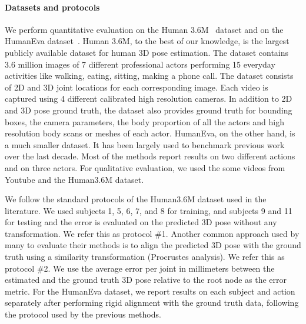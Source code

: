 \documentclass[runningheads]{llncs}
\begin{document}
\paragraph{Datasets and protocols} 

We perform quantitative evaluation on the Human 3.6M~\cite{h36m_pami} dataset and on the HumanEva dataset~\cite{heva}. Human 3.6M, to the best of our knowledge, is the largest publicly available dataset for human 3D pose estimation. The dataset contains 3.6 million images of 7 different professional actors performing 15 everyday activities like walking, eating, sitting, making a phone call. The dataset consists of 2D and 3D joint locations for each corresponding image. Each video is captured using 4 different calibrated high resolution cameras. In addition to 2D and 3D pose ground truth, the dataset also provides ground truth for bounding boxes, the camera parameters, the body proportion of all the actors and high resolution body scans or meshes of each actor. HumanEva, on the other hand, is a much smaller dataset. It has been largely used to benchmark previous work over the last decade. Most of the methods report results on two different actions and on three actors. For qualitative evaluation, we used the some videos from Youtube and the Human3.6M dataset.

We follow the standard protocols of the Human3.6M dataset used in the literature. We used subjects 1, 5, 6, 7, and 8 for training, and subjects 9 and 11 for testing and the error is evaluated on the predicted 3D pose without any transformation. We refer this as protocol \#1. Another common approach used by many to evaluate their methods is to align the predicted 3D pose with the ground truth using a similarity transformation (Procrustes analysis). We refer this as protocol \#2. We use the average error per joint in millimeters between the estimated and the ground truth 3D pose relative to the root node as the error metric. For the HumanEva dataset, we report results on each subject and action separately after performing rigid alignment with the ground truth data, following the protocol used by the previous methods. 
\end{document}
